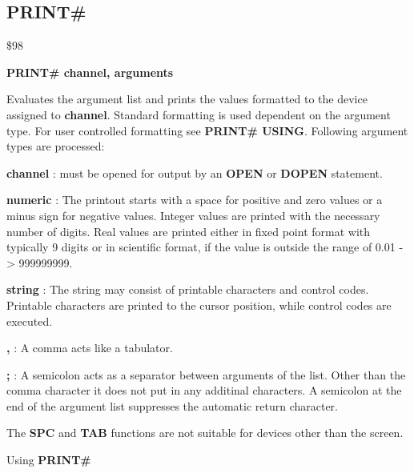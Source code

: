 
\newpage
\subsection{PRINT\#}
\begin{description}[leftmargin=3cm,style=nextline]
\item [Token:] \$98
\item [Format:] {\bf PRINT\# channel, arguments}
\item [Usage:]  Evaluates the argument list and prints the values
                formatted to the device assigned to {\bf channel}.
                Standard formatting is used dependent on the
                argument type. For user controlled formatting
                see {\bf PRINT\# USING}.
                Following argument types are processed:

                {\bf channel} : must be opened for output by
                an {\bf OPEN} or {\bf DOPEN} statement.

                {\bf numeric} : The printout starts with a space
                for positive and zero values or a minus sign for
                negative values. Integer values are printed with
                the necessary number of digits. Real values are
                printed either in fixed point format with typically
                9 digits or in scientific format, if the value is
                outside the range of 0.01 -> 999999999.

                {\bf string} : The string may consist of printable
                characters and control codes. Printable characters
                are printed to the cursor position, while control
                codes are executed.

                {\bf ,} : A comma acts like a tabulator.

                {\bf ;} : A semicolon acts as a separator between
                arguments of the list. Other than the comma character
                it does not put in any additinal characters.
                A semicolon at the end of the argument list suppresses
                the automatic return character.

\item [Remarks:] The {\bf SPC} and {\bf TAB} functions
                 are not suitable for devices other than the screen.

\item [Example:] Using {\bf PRINT\#}

\end{description}

